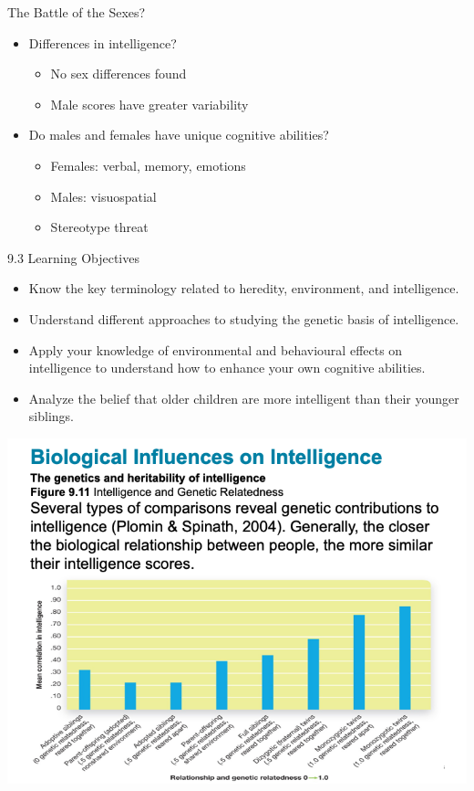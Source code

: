 \documentclass[
]{book}
\providecommand{\tightlist}{%
  \setlength{\itemsep}{0pt}\setlength{\parskip}{0pt}}
\begin{document}
\begin{reflect}
The Battle of the Sexes?

\begin{itemize}
\tightlist
\item
  Differences in intelligence?

  \begin{itemize}
  \tightlist
  \item
    No sex differences found\\
  \item
    Male scores have greater variability
  \end{itemize}
\item
  Do males and females have unique cognitive abilities?

  \begin{itemize}
  \tightlist
  \item
    Females: verbal, memory, emotions\\
  \item
    Males: visuospatial\\
  \item
    Stereotype threat
  \end{itemize}
\end{itemize}

9.3 Learning Objectives

\begin{itemize}
\tightlist
\item
  Know the key terminology related to heredity, environment, and intelligence.\\
\item
  Understand different approaches to studying the genetic basis of intelligence.\\
\item
  Apply your knowledge of environmental and behavioural effects on intelligence to understand how to enhance your own cognitive abilities.\\
\item
  Analyze the belief that older children are more intelligent than their younger siblings.
\end{itemize}

\includegraphics{assets/unit_2/slide_36.png}


\end{reflect}
\end{document}
